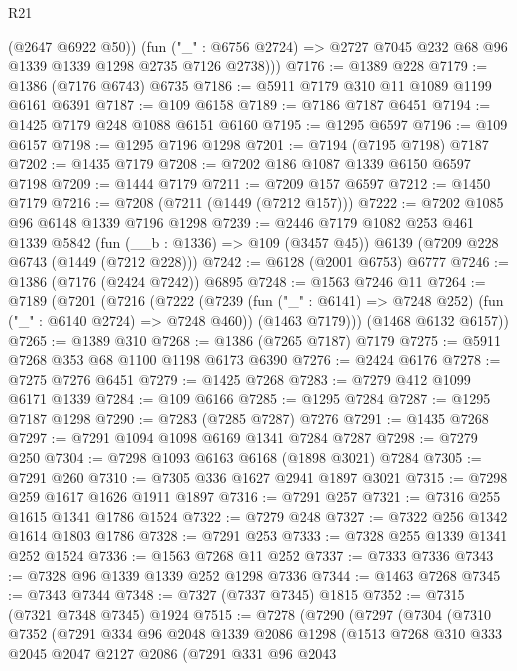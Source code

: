 \begin{lexlean}{R21}
\begin{coremodule}
          (@2647 @6922 @50))
        (fun ("_" : @6756 @2724) => @2727 @7045 @232 @68 @96 @1339 @1339 @1298 @2735 @7126 @2738)))
@7176 := @1389 @228
@7179 := @1386 (@7176 @6743) @6735
@7186 := @5911 @7179 @310 @11 @1089 @1199 @6161 @6391
@7187 := @109 @6158
@7189 := @7186 @7187 @6451
@7194 := @1425 @7179 @248 @1088 @6151 @6160
@7195 := @1295 @6597
@7196 := @109 @6157
@7198 := @1295 @7196 @1298
@7201 := @7194 (@7195 @7198) @7187
@7202 := @1435 @7179
@7208 := @7202 @186 @1087 @1339 @6150 @6597 @7198
@7209 := @1444 @7179
@7211 := @7209 @157 @6597
@7212 := @1450 @7179
@7216 := @7208 (@7211 (@1449 (@7212 @157)))
@7222 := @7202 @1085 @96 @6148 @1339 @7196 @1298
@7239 := @2446
    @7179
    @1082
    @253
    @461
    @1339
    @5842
    (fun (__b : @1336) => @109 (@3457 @45))
    @6139
    (@7209 @228 @6743 (@1449 (@7212 @228)))
@7242 := @6128 (@2001 @6753) @6777
@7246 := @1386 (@7176 (@2424 @7242)) @6895
@7248 := @1563 @7246 @11
@7264 := @7189
    (@7201
      (@7216
        (@7222
          (@7239 (fun ("_" : @6141) => @7248 @252) (fun ("_" : @6140 @2724) => @7248 @460))
          (@1463 @7179)))
      (@1468 @6132 @6157))
@7265 := @1389 @310
@7268 := @1386 (@7265 @7187) @7179
@7275 := @5911 @7268 @353 @68 @1100 @1198 @6173 @6390
@7276 := @2424 @6176
@7278 := @7275 @7276 @6451
@7279 := @1425 @7268
@7283 := @7279 @412 @1099 @6171 @1339
@7284 := @109 @6166
@7285 := @1295 @7284
@7287 := @1295 @7187 @1298
@7290 := @7283 (@7285 @7287) @7276
@7291 := @1435 @7268
@7297 := @7291 @1094 @1098 @6169 @1341 @7284 @7287
@7298 := @7279 @250
@7304 := @7298 @1093 @6163 @6168 (@1898 @3021) @7284
@7305 := @7291 @260
@7310 := @7305 @336 @1627 @2941 @1897 @3021
@7315 := @7298 @259 @1617 @1626 @1911 @1897
@7316 := @7291 @257
@7321 := @7316 @255 @1615 @1341 @1786 @1524
@7322 := @7279 @248
@7327 := @7322 @256 @1342 @1614 @1803 @1786
@7328 := @7291 @253
@7333 := @7328 @255 @1339 @1341 @252 @1524
@7336 := @1563 @7268 @11 @252
@7337 := @7333 @7336
@7343 := @7328 @96 @1339 @1339 @252 @1298 @7336
@7344 := @1463 @7268
@7345 := @7343 @7344
@7348 := @7327 (@7337 @7345) @1815
@7352 := @7315 (@7321 @7348 @7345) @1924
@7515 := @7278
    (@7290
      (@7297
        (@7304
          (@7310
            @7352
            (@7291
              @334
              @96
              @2048
              @1339
              @2086
              @1298
              (@1513
                @7268
                @310
                @333
                @2045
                @2047
                @2127
                @2086
                (@7291
                  @331
                  @96
                  @2043

\end{coremodule}
\end{lexlean}
